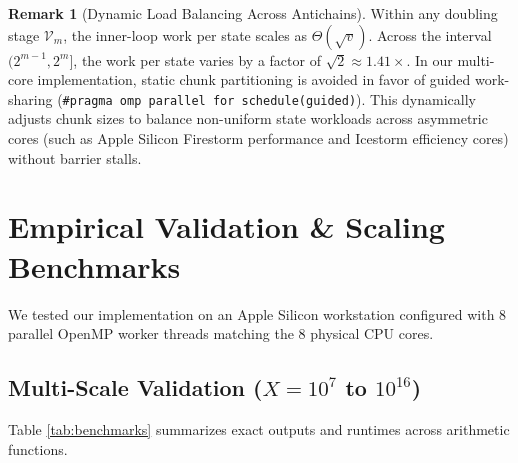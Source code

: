 \documentclass[11pt,a4paper]{article}
\theoremstyle{plain}
\theoremstyle{definition}
\newtheorem{remark}[theorem]{Remark}
\newcommand{\V}{\mathcal{V}}
\begin{document}
\begin{remark}[Dynamic Load Balancing Across Antichains]
Within any doubling stage $\V_m$, the inner-loop work per state scales as $\Theta(\sqrt{v})$. Across the interval $(2^{m-1}, 2^m]$, the work per state varies by a factor of $\sqrt{2} \approx 1.41\times$. In our multi-core implementation, static chunk partitioning is avoided in favor of guided work-sharing (\texttt{\#pragma omp parallel for schedule(guided)}). This dynamically adjusts chunk sizes to balance non-uniform state workloads across asymmetric cores (such as Apple Silicon Firestorm performance and Icestorm efficiency cores) without barrier stalls.
\end{remark}


\section{Empirical Validation \& Scaling Benchmarks}
\label{sec:benchmarks}

We tested our implementation on an Apple Silicon workstation configured with 8 parallel OpenMP worker threads matching the 8 physical CPU cores.

\subsection{Multi-Scale Validation ($X = 10^7$ to $10^{16}$)}

Table \ref{tab:benchmarks} summarizes exact outputs and runtimes across arithmetic functions.
\end{document}
